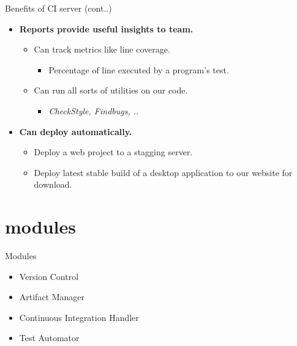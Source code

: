 \documentclass{beamer}
\begin{document}
\begin{frame}{Benefits of CI server (cont..)}
\vspace{0.5cm}
 \begin{itemize}
\item \textbf{Reports provide useful insights to team.}
\begin{itemize}
\vspace{0.5cm}
\item Can track metrics like line coverage.
\begin{itemize}
\vspace{0.5cm}
\item Percentage of line executed by a program's test.
\end{itemize}
\end{itemize}
\begin{itemize}
\vspace{0.5cm}
\item Can run all sorts of utilities on our code.
\begin{itemize}
\vspace{0.5cm}
\item \textit{CheckStyle, Findbugs, ..}
\end{itemize}
\end{itemize}
\item \textbf{Can deploy automatically.}
\vspace{0.5cm}
\begin{itemize}
\item Deploy a web project to a stagging server.
\vspace{0.5cm}
\item Deploy latest stable build of a desktop application to our website for download.
\end{itemize}
\end{itemize}
\end{frame} 

\section{modules}
\begin{frame}{Modules}
\begin{itemize}
\item Version Control
\item Artifact Manager
\item Continuous Integration Handler
\item Test Automator

\end{itemize}

\end{frame}
\end{document}
